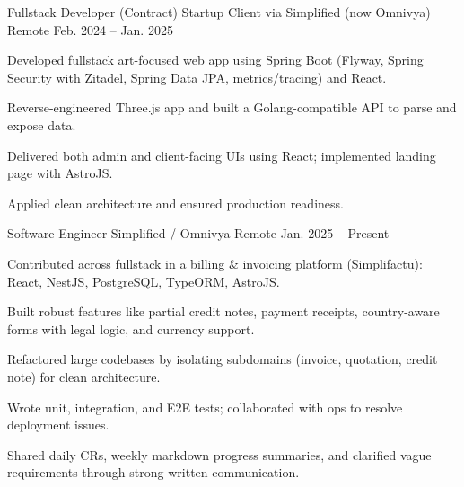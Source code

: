 
\vspace{1.5em} %

\begin{cventries}

  \cventry
    {Fullstack Developer (Contract)} %
    {Startup Client via Simplified (now Omnivya)} %
    {Remote} %
    {Feb. 2024 -- Jan. 2025} %
    {
      \begin{cvitems}
        \item {Developed fullstack art-focused web app using Spring Boot (Flyway, Spring Security with Zitadel, Spring Data JPA, metrics/tracing) and React.}
        \item {Reverse-engineered Three.js app and built a Golang-compatible API to parse and expose data.}
        \item {Delivered both admin and client-facing UIs using React; implemented landing page with AstroJS.}
        \item {Applied clean architecture and ensured production readiness.}
      \end{cvitems}
    }

  \vspace{1.2em} %

  \cventry
    {Software Engineer} %
    {Simplified / Omnivya} %
    {Remote} %
    {Jan. 2025 -- Present} %
    {
      \begin{cvitems}
        \item {Contributed across fullstack in a billing \& invoicing platform (Simplifactu): React, NestJS, PostgreSQL, TypeORM, AstroJS.}
        \item {Built robust features like partial credit notes, payment receipts, country-aware forms with legal logic, and currency support.}
        \item {Refactored large codebases by isolating subdomains (invoice, quotation, credit note) for clean architecture.}
        \item {Wrote unit, integration, and E2E tests; collaborated with ops to resolve deployment issues.}
        \item {Shared daily CRs, weekly markdown progress summaries, and clarified vague requirements through strong written communication.}
      \end{cvitems}
    }

\end{cventries}
